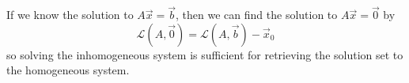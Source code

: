 \begin{crl}
	If we know the solution to $A\vec{x}=\vec{b}$, then we can find the solution
	to $A\vec{x}=\vec{0}$ by
	\begin{equation*}
		\mathcal{L}(A,\vec{0})=\mathcal{L}(A,\vec{b})-\vec{x}_0
	\end{equation*}
	so solving the inhomogeneous system is sufficient for retrieving the
	solution set to the homogeneous system.
\end{crl}
